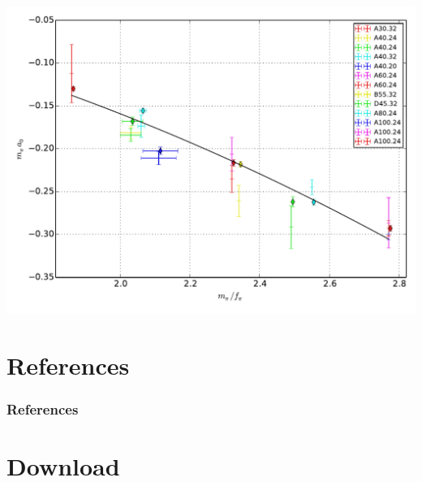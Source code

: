 \documentclass[english, fleqn]{beamer}
\begin{document}
\begin{frame}
    \begin{centering}
        \includegraphics[height=\textheight]{plots/result.pdf}
    \end{centering}
\end{frame}


\section*{References}

\begin{frame}
    \frametitle{References}

    \printbibliography
\end{frame}

\section*{Download}
\end{document}
